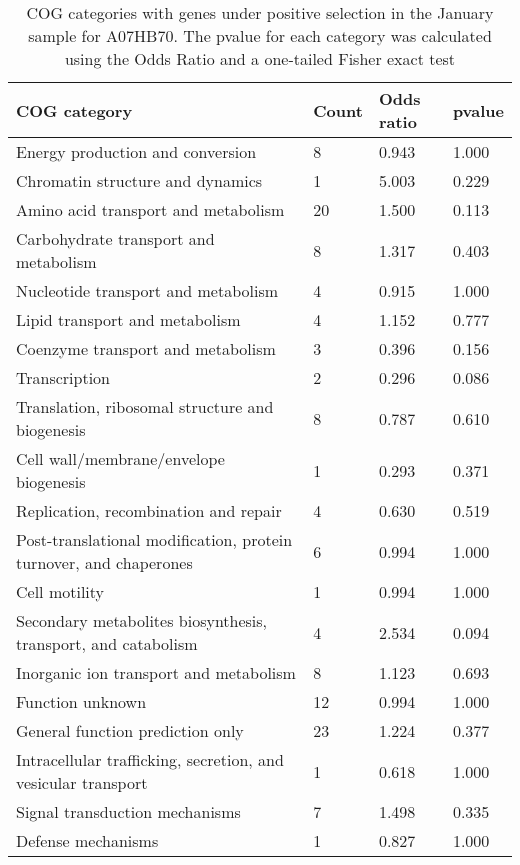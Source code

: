 \begin{table}[]
\footnotesize 
	\tabcolsep=0.11cm 
\caption{COG categories with genes under positive selection in the January sample for A07HB70. The pvalue for each category was calculated using the Odds Ratio and a one-tailed Fisher exact test \\} 
\begin{tabularx}{\textwidth}{L{6cm}R{2cm}R{2cm}R{2cm}} 
\hline 
\textbf{COG category} & \textbf{Count} & \textbf{Odds ratio} & \textbf{pvalue} \\ 
\hline 
Energy production and conversion & 8 & 0.943 & 1.000 \\ 
Chromatin structure and dynamics & 1 & 5.003 & 0.229 \\ 
Amino acid transport and metabolism & 20 & 1.500 & 0.113 \\ 
Carbohydrate transport and metabolism & 8 & 1.317 & 0.403 \\ 
Nucleotide transport and metabolism & 4 & 0.915 & 1.000 \\ 
Lipid transport and metabolism & 4 & 1.152 & 0.777 \\ 
Coenzyme transport and metabolism & 3 & 0.396 & 0.156 \\ 
Transcription & 2 & 0.296 & 0.086 \\ 
Translation, ribosomal structure and biogenesis & 8 & 0.787 & 0.610 \\ 
Cell wall/membrane/envelope biogenesis & 1 & 0.293 & 0.371 \\ 
Replication, recombination and repair & 4 & 0.630 & 0.519 \\ 
Post-translational modification, protein turnover, and chaperones & 6 & 0.994 & 1.000 \\ 
Cell motility & 1 & 0.994 & 1.000 \\ 
Secondary metabolites biosynthesis, transport, and catabolism & 4 & 2.534 & 0.094 \\ 
Inorganic ion transport and metabolism & 8 & 1.123 & 0.693 \\ 
Function unknown & 12 & 0.994 & 1.000 \\ 
General function prediction only & 23 & 1.224 & 0.377 \\ 
Intracellular trafficking, secretion, and vesicular transport & 1 & 0.618 & 1.000 \\ 
Signal transduction mechanisms & 7 & 1.498 & 0.335 \\ 
Defense mechanisms & 1 & 0.827 & 1.000 \\ 
\end{tabularx} 
\label{January_COG_Selection_A07HB70} 
 \end{table} 

